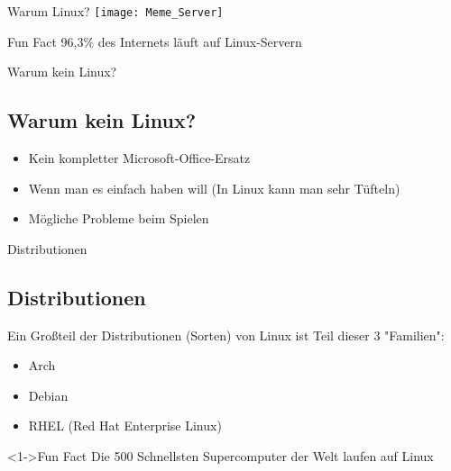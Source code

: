 \begin{frame}{Warum Linux?}
    \texttt{[image: Meme\_Server]}

    \begin{exampleblock}{Fun Fact}
        96,3\% des Internets läuft auf Linux-Servern
    \end{exampleblock}
\end{frame}

\begin{frame}{Warum kein Linux?}
    \subsection{Warum kein Linux?}\label{subsec:warum-kein-linux?}

    \begin{itemize}
        \item Kein kompletter Microsoft-Office-Ersatz
        \item Wenn man es einfach haben will (In Linux kann man sehr Tüfteln)
        \item Mögliche Probleme beim Spielen
    \end{itemize}

\end{frame}

\begin{frame}{Distributionen}
    \subsection{Distributionen}\label{subsec:distributionen}

    Ein Großteil der Distributionen (Sorten) von Linux ist Teil dieser 3 "Familien":

    \pause

    \begin{itemize}
        \item Arch
        \item Debian
        \item RHEL (Red Hat Enterprise Linux)
    \end{itemize}

    \vspace{0.5cm}
    \begin{exampleblock}<1->{Fun Fact}
        Die 500 Schnellsten Supercomputer der Welt laufen auf Linux
    \end{exampleblock}

\end{frame}


